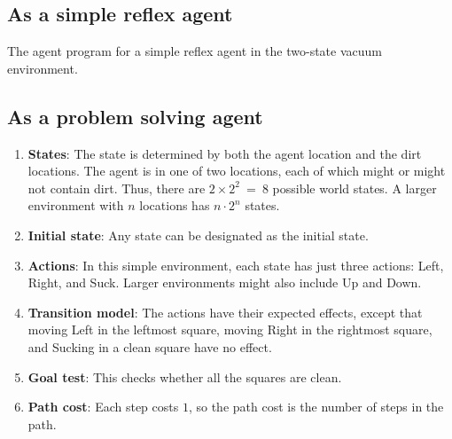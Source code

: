 \subsection{As a simple reflex agent}

\begin{algorithm}[H]
    \caption{The agent program for a simple reflex agent in the two-state vacuum environment.  \cite{ai/book/Artificial-Intelligence-A-Modern-Approach/Russell-Norvig}}

\end{algorithm}







\subsection{As a problem solving agent}

\begin{enumerate}[itemsep=0.2cm]
    \item \textbf{States}: The state is determined by both the agent location and the dirt locations. The agent is in one of two locations, each of which might or might not contain dirt. Thus, there are $2 \times 2^2\ =\ 8$ possible world states. A larger environment with $n$ locations has $n \cdot 2^n$ states.

    \item \textbf{Initial state}: Any state can be designated as the initial state.

    \item \textbf{Actions}: In this simple environment, each state has just three actions: Left, Right, and Suck. Larger environments might also include Up and Down.

    \item \textbf{Transition model}: The actions have their expected effects, except that moving Left in the leftmost square, moving Right in the rightmost square, and Sucking in a clean square have no effect.

    \item \textbf{Goal test}: This checks whether all the squares are clean.

    \item \textbf{Path cost}: Each step costs $1$, so the path cost is the number of steps in the path.
\end{enumerate}

